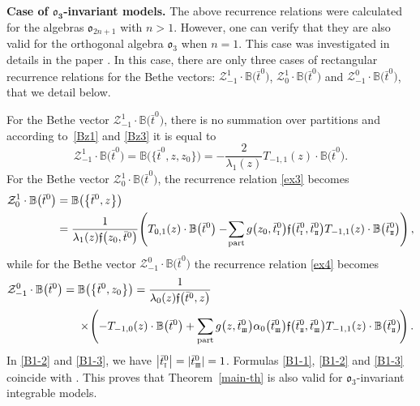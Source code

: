 \documentclass[10pt,a4paper]{amsart}
\newcommand{\so}{\scriptscriptstyle \rm I}
\newcommand{\st}{\scriptscriptstyle \rm I\hspace{-1pt}I}
\newcommand{\sth}{\scriptscriptstyle \rm I\hspace{-1pt}I\hspace{-1pt}I}
\newcommand{\bt}{{\bar t}}
\theoremstyle{definition}
\def\BB{{\mathbb{B}}}
\def\r#1{\eqref{#1}}
\def\sk#1{\left(#1\right)}
\def\fgo{\mathfrak{f}}
\def\Z{\mathcal{Z}}
\begin{document}
{\bf Case of $\boldsymbol{\mathfrak{o}_{3}}$-invariant models.}
The above recurrence relations were calculated for the algebras $\mathfrak{o}_{2n+1}$
with $n>1$. However, one can verify that they are also valid for
the orthogonal algebra $\mathfrak{o}_3$ when $n=1$.
This case was investigated in details in the paper \cite{LPRS19}.
In this case, there are only three cases of rectangular recurrence relations
for the Bethe vectors:
$\Z^{1}_{-1}\cdot\BB\bigl(\bt^0\bigr)$, $\Z^{1}_{0}\cdot\BB\bigl(\bt^0\bigr)$ and
$\Z^{0}_{-1}\cdot\BB\bigl(\bt^0\bigr)$, that we detail below.

For the Bethe vector $\Z^{1}_{-1}\cdot\BB\bigl(\bt^0\bigr)$, there is no summation over partitions
 and according to~\r{Bz1} and \r{Bz3}
it is equal to
\begin{equation}\label{B1-1}
\Z^{1}_{-1}\cdot\BB\bigl(\bt^0\bigr)=
\BB\bigl(\bigl\{\bt^0,z,z_0\bigr\}\bigr)= -\frac{2}{\lambda_1(z)} T_{-1,1}(z)\cdot \BB\bigl(\bt^0\bigr) .
\end{equation}
For the Bethe vector $\Z^{1}_{0}\cdot\BB\bigl(\bt^0\bigr)$, the recurrence
relation \r{ex3} becomes
\begin{align}
\Z^{1}_{0}\cdot\BB\bigl(\bt^0\bigr)&=\BB\bigl(\bigl\{\bt^0,z\bigr\}\bigr)\nonumber\\
 &=\frac{1}{\lambda_1(z)\fgo\bigl(z_0,\bt^0\bigr)}\!
\sk{T_{0,1}(z)\cdot\BB\bigl(\bt^0\bigr)-\!\sum_{\rm part}
g\bigl(z_0,\bt^0_{\so}\bigr)\fgo\bigl(\bt^0_{\so},\bt^0_{\st}\bigr) T_{-1,1}(z)\cdot\BB\bigl(\bt^0_{\st}\bigr)} ,\label{B1-2}
\end{align}
while for the Bethe vector $\Z^{0}_{-1}\cdot\BB\bigl(\bt^0\bigr)$
the recurrence relation \r{ex4} becomes
\begin{align}
 \Z^{0}_{-1}\cdot\BB\bigl(\bt^0\bigr)={}&\BB\bigl(\bigl\{\bt^0,z_0\bigr\}\bigr)=\frac{1}{\lambda_0(z)\fgo\bigl(\bt^0,z\bigr)}\nonumber\\
 &\times\!
\sk{-T_{-1,0}(z)\cdot\BB\bigl(\bt^0\bigr)+\sum_{\rm part}
g\bigl(z,\bt^0_{\sth}\bigr) \alpha_0\bigl(\bt^0_{\sth}\bigr) \fgo\bigl(\bt^0_{\st},\bt^0_{\sth}\bigr)
T_{-1,1}(z)\cdot\BB\bigl(\bt^0_{\st}\bigr)\!} .\label{B1-3}
\end{align}
In \r{B1-2} and \r{B1-3}, we have $\big|\bt^0_{\so}\big|=|\bt^0_{\sth}|=1$.
Formulas \r{B1-1}, \r{B1-2} and \r{B1-3} coincide with
\cite[formulas (4.15), (4,19) and (4.20)]{LPRS19}. This proves that
Theorem~\ref{main-th} is also valid for $\mathfrak{o}_3$-invariant integrable models.
\end{document}

